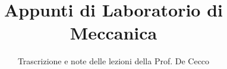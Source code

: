 \documentclass[a4paper,12pt]{article}
\title{Appunti di Laboratorio di Meccanica}
\author{Trascrizione e note delle lezioni della Prof. De Cecco}
\date{}
\begin{document}
\maketitle
\projectintro
\tableofcontents
\newpage

\end{document}
